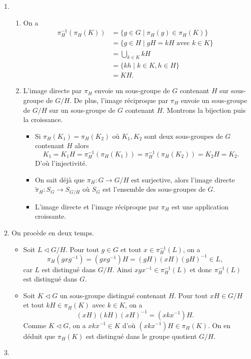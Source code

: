 \documentclass[./main]{subfiles}
\begin{document}
  \begin{enumerate}
    \item
      \begin{enumerate}
        \item On a
          \begin{align*}
            \pi_H^{-1}(\pi_H(K)) &= \{g \in G  \mid \pi_H(g) \in \pi_H(K)\}\\
            &= \{g \in H  \mid gH = k H \text{ avec } k \in K\}\\
            &= \bigcup_{k \in K} kH \\
            &= \{kh  \mid k \in K, h \in H\}\\
            &= KH
          .\end{align*}
        \item L'image directe par $\pi_H$ envoie un sous-groupe de $G$ contenant $H$ sur sous-groupe de $G / H$.
          De plus, l'image réciproque par $\pi_H$ envoie un sous-groupe de $G / H$ sur un sous-groupe de $G$ contenant $H$.
          Montrons la bijection puis la croissance.
          \begin{itemize}
            \item Si $\pi_H(K_1) = \pi_H(K_2)$ où $K_1,K_2$ sont deux sous-groupes de $G$ contenant $H$ alors \[
                K_1 = K_1 H = \pi_H^{-1}(\pi_H(K_1)) = \pi_H^{-1}(\pi_H(K_2)) = K_2 H = K_2.
              \]
              D'où l'injectivité.
            \item On sait déjà que $\pi_H : G \to G / H$ est surjective, alors l'image directe $\tilde{\pi}_H : S_G \to S_{G / H}$ où $S_G$ est l'ensemble des sous-groupes de $G$.
            \item L'image directe et l'image réciproque par $\pi_H$ est une application croissante.
          \end{itemize}
      \end{enumerate}
      \item On procède en deux temps.
        \begin{itemize}
          \item Soit $L \triangleleft G / H$. Pour tout $g \in G$ et tout $x \in \pi_H^{-1}(L)$, on a \[
              \pi_H(g x g^{-1}) = (g x g^{-1})H = (gH) (xH)(gH)^{-1} \in L
            ,\] car $L$ est distingué dans $G / H$.
            Ainsi $x g x^{-1} \in \pi_H^{-1}(L)$ et donc $\pi_H^{-1}(L)$ est distingué dans $G$.
          \item Soit $K \triangleleft G$ un sous-groupe distingué contenant $H$.
            Pour tout $xH \in G / H$ et tout $k H \in \pi_H(K)$ avec $k \in K$, on a \[
              (xH)(kH)(xH)^{-1} = (x k x^{-1})H
            .\]
            Comme $K \triangleleft G$, on a $x k x^{-1} \in K$ d'où $(x kx^{-1})H \in \pi_H(K)$.
            On en déduit que $\pi_H(K)$ est distingué dans le groupe quotient $G / H$.
        \end{itemize}
      \item 
  \end{enumerate}
\end{document}

